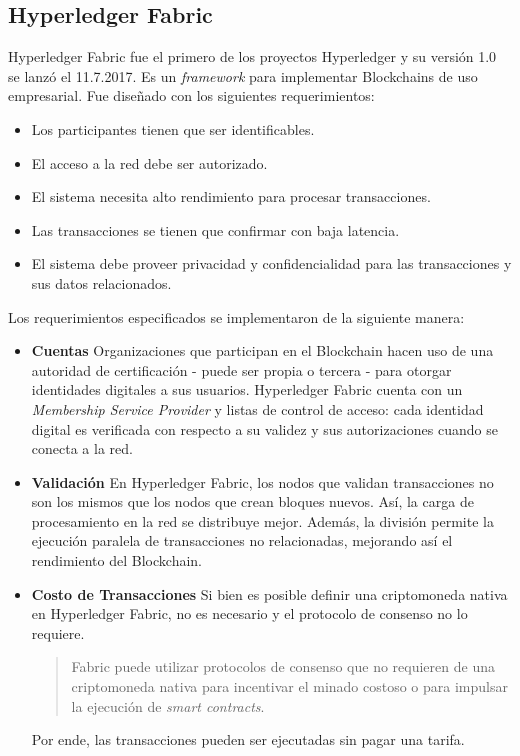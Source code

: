 \subsection{Hyperledger Fabric}
Hyperledger Fabric fue el primero de los proyectos Hyperledger y su versión 1.0 se lanzó el 11.7.2017.\cite{hlf_release} Es un \textit{framework} para implementar Blockchains de uso empresarial. Fue diseñado con los siguientes requerimientos:\cite{hlf_whatis}
\begin{itemize}
\item[\textendash] Los participantes tienen que ser identificables.
\item[\textendash] El acceso a la red debe ser autorizado.
\item[\textendash] El sistema necesita alto rendimiento para procesar transacciones.
\item[\textendash] Las transacciones se tienen que confirmar con baja latencia.
\item[\textendash] El sistema debe proveer privacidad y confidencialidad para las transacciones y sus datos relacionados.
\end{itemize}

Los requerimientos especificados se implementaron de la siguiente manera:
\begin{itemize}
\item \textbf{Cuentas} \newline
Organizaciones que participan en el Blockchain hacen uso de una autoridad de certificación - puede ser propia o tercera - para otorgar identidades digitales a sus usuarios. Hyperledger Fabric cuenta con un \textit{Membership Service Provider} y listas de control de acceso: cada identidad digital es verificada con respecto a su validez y sus autorizaciones cuando se conecta a la red.
\item \textbf{Validación} \newline
En Hyperledger Fabric, los nodos que validan transacciones no son los mismos que los nodos que crean bloques nuevos. Así, la carga de procesamiento en la red se distribuye mejor. Además, la división permite la ejecución paralela de transacciones no relacionadas, mejorando así el rendimiento del Blockchain.

\item \textbf{Costo de Transacciones} \newline
Si bien es posible definir una criptomoneda nativa en Hyperledger Fabric, no es necesario y el protocolo de consenso no lo requiere.
\begin{quote}
Fabric puede utilizar protocolos de consenso que no requieren de una criptomoneda nativa para incentivar el minado costoso o para impulsar la ejecución de \textit{smart contracts}.\cite{hlf_whatis}
\end{quote}
 Por ende, las transacciones pueden ser ejecutadas sin pagar una tarifa.
\end{itemize}

